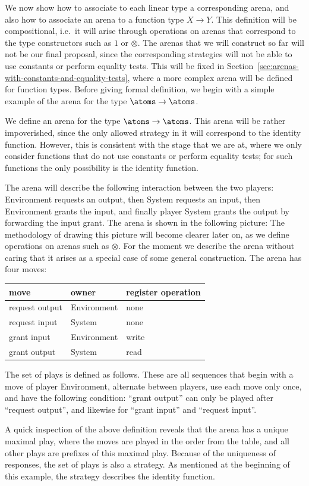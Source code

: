 We now show how to associate to each linear type a corresponding arena, and also how to associate an arena to a function type $X \to Y$. This definition will be compositional, i.e.~it will arise through operations on arenas that correspond to the type constructors such as $1$ or $\otimes$. The arenas that we will construct so far will not be our final proposal, since the corresponding strategies will not be able to use constants or perform equality tests. This will be fixed in Section~\ref{sec:arenas-with-constants-and-equality-tests}, where a more complex arena will be defined for function types. Before giving formal definition, we begin with a simple example of the arena for the type $\atoms \to \atoms$.
\begin{example}\label{ex:identity-function-without-equality-tests-and-constants}
    We define an arena for the type $\atoms \to \atoms$. This arena will be rather impoverished, since the  only allowed strategy in it will correspond to the identity function. However, this is consistent with the stage that we are at, where we only consider functions that do not use constants or perform equality tests; for such functions the only possibility is the identity function.

     The arena will describe the following interaction between the two players: Environment  requests an output,  then System requests an input, then Environment grants the input, and finally player System grants the output by forwarding the input grant. 
    The arena is shown in the following picture: 
    The methodology of drawing this picture will become clearer later on, as we define operations on arenas such as $\otimes$. For the moment we describe the arena without caring that it arises as a special case of some general construction. The arena has four moves: 
    \begin{center}
        \begin{tabular}{lll}
         move & owner & register operation \\
            \hline
            request output & Environment & none \\
            request input & System & none \\
            grant input & Environment & write \\
            grant output & System & read 
        \end{tabular}    
    \end{center}
    The set of plays is defined as follows. These are all sequences that begin with a move of player Environment, alternate between players, use each move only once, and have the following condition:  ``grant output'' can only be played after ``request output'', and likewise for ``grant input'' and ``request input''.  

    A quick inspection of the above definition reveals that the arena has a unique maximal play, where the moves are played in the order from the table, and all other plays are prefixes of this maximal play. Because of the uniqueness of responses, the set of plays is also a strategy. As mentioned at the beginning of this example, the strategy describes the identity function.  \exampleend
\end{example}


